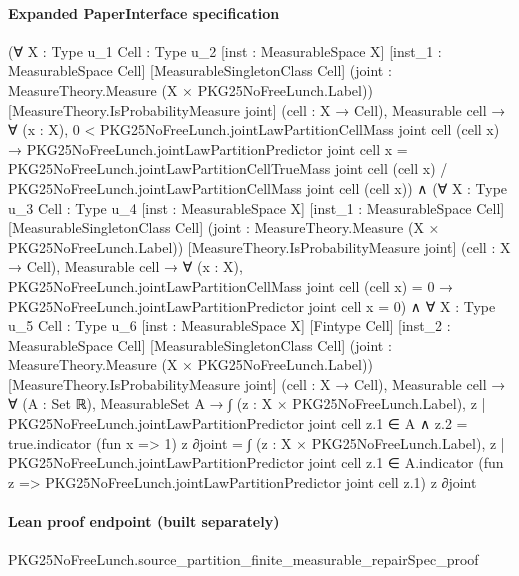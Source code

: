 \documentclass[10pt]{article}
\begin{document}
\paragraph{Expanded PaperInterface specification}
\begin{ReviewVerbatim}
(∀ {X : Type u_1} {Cell : Type u_2} [inst : MeasurableSpace X] [inst_1 : MeasurableSpace Cell]
    [MeasurableSingletonClass Cell] (joint : MeasureTheory.Measure (X × PKG25NoFreeLunch.Label))
    [MeasureTheory.IsProbabilityMeasure joint] (cell : X → Cell),
    Measurable cell →
      ∀ (x : X),
        0 < PKG25NoFreeLunch.jointLawPartitionCellMass joint cell (cell x) →
          PKG25NoFreeLunch.jointLawPartitionPredictor joint cell x =
            PKG25NoFreeLunch.jointLawPartitionCellTrueMass joint cell (cell x) /
              PKG25NoFreeLunch.jointLawPartitionCellMass joint cell (cell x)) ∧
  (∀ {X : Type u_3} {Cell : Type u_4} [inst : MeasurableSpace X] [inst_1 : MeasurableSpace Cell]
      [MeasurableSingletonClass Cell] (joint : MeasureTheory.Measure (X × PKG25NoFreeLunch.Label))
      [MeasureTheory.IsProbabilityMeasure joint] (cell : X → Cell),
      Measurable cell →
        ∀ (x : X),
          PKG25NoFreeLunch.jointLawPartitionCellMass joint cell (cell x) = 0 →
            PKG25NoFreeLunch.jointLawPartitionPredictor joint cell x = 0) ∧
    ∀ {X : Type u_5} {Cell : Type u_6} [inst : MeasurableSpace X] [Fintype Cell] [inst_2 : MeasurableSpace Cell]
      [MeasurableSingletonClass Cell] (joint : MeasureTheory.Measure (X × PKG25NoFreeLunch.Label))
      [MeasureTheory.IsProbabilityMeasure joint] (cell : X → Cell),
      Measurable cell →
        ∀ (A : Set ℝ),
          MeasurableSet A →
            ∫ (z : X × PKG25NoFreeLunch.Label),
                {z | PKG25NoFreeLunch.jointLawPartitionPredictor joint cell z.1 ∈ A ∧ z.2 = true}.indicator (fun x => 1)
                  z ∂joint =
              ∫ (z : X × PKG25NoFreeLunch.Label),
                {z | PKG25NoFreeLunch.jointLawPartitionPredictor joint cell z.1 ∈ A}.indicator
                  (fun z => PKG25NoFreeLunch.jointLawPartitionPredictor joint cell z.1) z ∂joint
\end{ReviewVerbatim}

\paragraph{Lean proof endpoint (built separately)}\begin{ReviewVerbatim}
PKG25NoFreeLunch.source_partition_finite_measurable_repairSpec_proof
\end{ReviewVerbatim}
\end{document}
